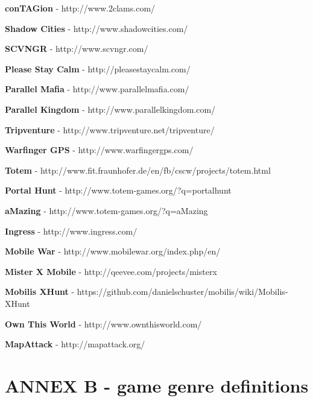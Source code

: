 \documentclass{article}
\begin{document}
\textbf{conTAGion} - http://www.2clams.com/ \newline

\textbf{Shadow Cities} - http://www.shadowcities.com/ \newline

\textbf{SCVNGR} - http://www.scvngr.com/ \newline

\textbf{Please Stay Calm} - http://pleasestaycalm.com/ \newline

\textbf{Parallel Mafia} - http://www.parallelmafia.com/ \newline

\textbf{Parallel Kingdom} - http://www.parallelkingdom.com/ \newline

\textbf{Tripventure} - http://www.tripventure.net/tripventure/ \newline

\textbf{Warfinger GPS} - http://www.warfingergps.com/ \newline

\textbf{Totem} - http://www.fit.fraunhofer.de/en/fb/cscw/projects/totem.html
\newline

\textbf{Portal Hunt} - http://www.totem-games.org/?q=portalhunt \newline

\textbf{aMazing} - http://www.totem-games.org/?q=aMazing \newline

\textbf{Ingress} - http://www.ingress.com/ \newline

\textbf{Mobile War} - http://www.mobilewar.org/index.php/en/ \newline

\textbf{Mister X Mobile} - http://qeevee.com/projects/misterx \newline

\textbf{Mobilis XHunt} - https://github.com/danielschuster/mobilis/wiki/Mobilis-XHunt
\newline

\textbf{Own This World} - http://www.ownthisworld.com/ \newline

\textbf{MapAttack} - http://mapattack.org/ \newline



\section{ANNEX B - game genre definitions}
\end{document}
